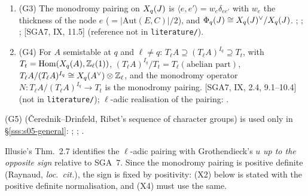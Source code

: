 \begin{theorem}
\begin{enumerate}[label=(\roman*)]
  .
\item (G3) The monodromy pairing on $X_q(J)$ is $\langle e,e'\rangle=w_e\delta_{ee'}$ with $w_e$ the thickness of the node $e$
  ($=|\mathrm{Aut}(E,C)|/2$), and $\Phi_q(J)\cong X_q(J)^\vee/X_q(J)$.
  \stcited{} ; ;
  ; [SGA7, IX, 11.5]
  (reference not in \texttt{literature/}).
\item (G4) For $A$ semistable at $q$ and $\ell\ne q$: $T_\ell A\supseteq(T_\ell A)^{I_q}\supseteq T_t$, with
  $T_t=\operatorname{Hom}(X_q(A),\mathbb{Z}_\ell(1))$, $(T_\ell A)^{I_q}/T_t=T_\ell(\text{abelian part})$, $T_\ell A/(T_\ell A)^{I_q}\cong X_q(A^\vee)\otimes\mathbb{Z}_\ell$,
  and the monodromy operator $N:T_\ell A/(T_\ell A)^{I_q}\to T_t$ is the monodromy pairing.
  \stcited{} [SGA7, IX, 2.4, 9.1--10.4] (not in \texttt{literature/}); $\ell$-adic realisation of the pairing:
  .
\end{enumerate}
\end{theorem}
\noindent(G5) (Čerednik--Drinfeld, Ribet's sequence of character groups) is used only in
\S\ref{sss:s05-general}: \stcited{} ; ;
.

\begin{remark}\label{rem:s05-illusie}
Illusie's Thm.~2.7 identifies the $\ell$-adic pairing with Grothendieck's $u$ \emph{up to the opposite sign} relative to SGA~7.
Since the monodromy pairing is positive definite (Raynaud, \emph{loc.\ cit.}), the sign is fixed by positivity: (X2) below is
stated with the positive definite normalisation, and (X4) must use the same.
\end{remark}

